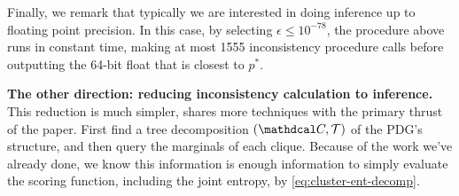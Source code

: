 \begin{lproof}
    Finally, we remark that
    typically we are interested in doing inference up to floating point 
    precision.
    In this case, by selecting
$\epsilon \le 10^{-78}$, the procedure above
runs in constant time, making at most 1555 
    inconsistency procedure calls before outputting
     the 64-bit float that is closest to $p^*$.

    \textbf{The other direction: reducing inconsistency calculation to inference.}
    This reduction is much simpler, shares more techniques with the primary
    thrust of the paper. First find a tree
    decomposition $(\C, \mathcal T)$ of the PDG's structure,
    and then query the marginals of each clique.  Because of the
    work we've already done, we know this information is enough
    information to simply evaluate the scoring function,
    including the joint entropy, by \eqref{eq:cluster-ent-decomp}.
\end{lproof}

